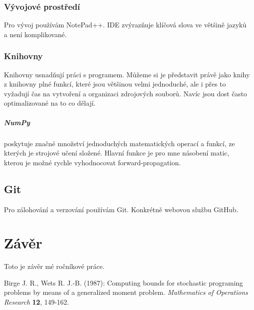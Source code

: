 \documentclass[12pt,a4paper]{report}
\begin{document}
		\subsection{Vývojové prostředí}
		Pro vývoj používám NotePad++. IDE zvýrazňuje klíčová slova ve většině jazyků a není komplikované.
		\subsection{Knihovny}
		Knihovny usnadňují práci s programem. Můžeme si je představit právě jako knihy z knihovny plné funkcí, které jsou většinou velmi jednoduché, ale i přes to vyžadují čas na vytvoření a organizaci zdrojových souborů. Navíc jsou dost často optimalizované na to co dělají.
			\paragraph{NumPy}
			poskytuje značné množství jednoduchých matematických operací a funkcí, ze kterých je strojové učení složené. Hlavní funkce je pro mne násobení matic, kterou je možné rychle vyhodnocovat forward-propagation.
	\section{Git}
		Pro zálohování a verzování používám Git. Konkrétně webovou službu GitHub.

\chapter{Závěr}
Toto je závěr mé ročníkové práce.

\begin{thebibliography}{99}

Birge J. R., Wets R. J.-B. (1987): Computing bounds for stochastic programing problems by means of a generalized moment problem. \textit{Mathematics of Operations Research} \textbf{12}, 149-162.
\end{thebibliography}


\openright
\end{document}
